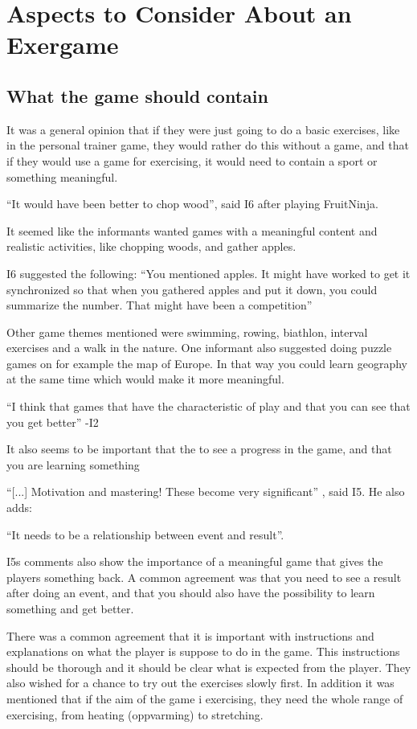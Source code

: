 \section{Aspects to Consider About an Exergame}
\subsection{What the game should contain}

It was a general opinion that if they were just going to do a basic exercises, like in the personal trainer game, they would rather do this without a game, and that if they would use a game for exercising, it would need to contain a sport or something meaningful. 

“It would have been better to chop wood”, said I6 after playing FruitNinja. 

It seemed like the informants wanted games with a meaningful content and realistic activities, like chopping woods, and gather apples. 

I6 suggested the following: “You mentioned apples. It might have worked to get it synchronized so that when you gathered apples and put it down, you could summarize the number. That might have been a competition” 

Other game themes mentioned were swimming, rowing, biathlon, interval exercises and a walk in the nature. One informant also suggested doing puzzle games on for example the map of Europe. In that way you could learn geography at the same time which would make it more meaningful.

“I think that games that have the characteristic of play and that you can see that you get better” -I2

It also seems to be important that the to see a progress in the game, and that you are learning something 

“[...] Motivation and mastering! These become very significant” , said I5. He also adds:

“It needs to be a relationship between event and result”.

I5s comments also show the importance of a meaningful game that gives the players something back. A common agreement was that you need to see a result after doing an event, and that you should also have the possibility to learn something and get better. 

There was a common agreement that it is important with instructions and explanations on what the player is suppose to do in the game. This instructions should be thorough and it should be clear what is expected from the player. They also wished for a chance to try out the exercises slowly first. In addition it was mentioned that if the aim of the game i exercising, they need the whole range of exercising, from heating (oppvarming) to stretching. 

